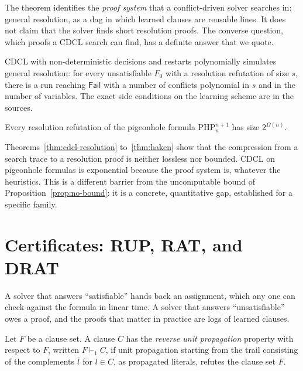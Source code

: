 The theorem identifies the \emph{proof system} that a conflict-driven solver searches in: general resolution, as a dag in which learned clauses are reusable lines. It does not claim that the solver finds short resolution proofs. The converse question, which proofs a CDCL search can find, has a definite answer that we quote.

\begin{theorem}
\label{thm:cdcl-simulates}
 CDCL with non-deterministic decisions and restarts polynomially simulates general resolution: for every unsatisfiable $F_0$ with a resolution refutation of size $s$, there is a run reaching $\mathsf{Fail}$ with a number of conflicts polynomial in $s$ and in the number of variables. The exact side conditions on the learning scheme are in the sources.
\end{theorem}

\begin{theorem}
\label{thm:haken}
 Every resolution refutation of the pigeonhole formula $\mathrm{PHP}_n^{n+1}$ has size $2^{\Omega(n)}$.
\end{theorem}

Theorems~\ref{thm:cdcl-resolution} to~\ref{thm:haken} show that the compression from a search trace to a resolution proof is neither lossless nor bounded. CDCL on pigeonhole formulas is exponential because the proof system is, whatever the heuristics. This is a different barrier from the uncomputable bound of Proposition~\ref{prop:no-bound}: it is a concrete, quantitative gap, established for a specific family.

\section{Certificates: RUP, RAT, and DRAT}
\label{sec:drat}

A solver that answers ``satisfiable'' hands back an assignment, which any one can check against the formula in linear time. A solver that answers ``unsatisfiable'' owes a proof, and the proofs that matter in practice are logs of learned clauses.

\begin{definition}[RUP]
\label{def:rup}
Let $F$ be a clause set. A clause $C$ has the \emph{reverse unit propagation} property with respect to $F$, written $F\vdash_{1}C$, if unit propagation starting from the trail consisting of the complements $\overline{l}$ for $l\in C$, as propagated literals, refutes the clause set $F$.
\end{definition}

